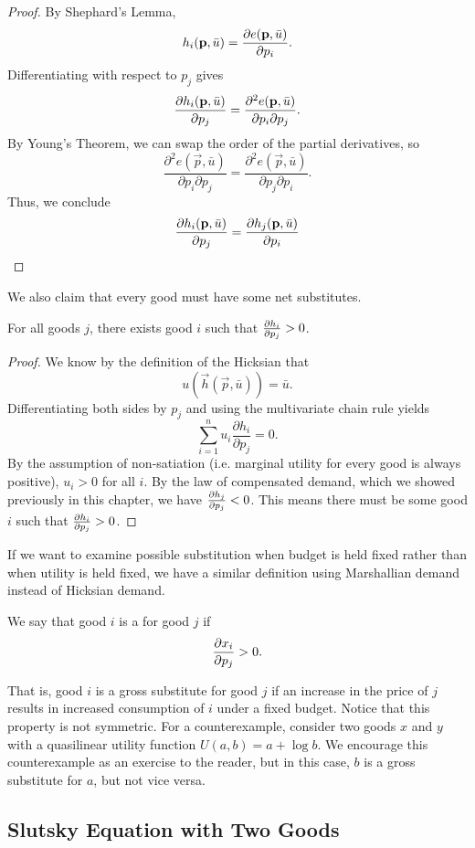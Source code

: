 \begin{proof}
By Shephard's Lemma, 
$$h_i(\mathbf{p}, \bar{u}) = \pdv{e(\mathbf{p}, \bar{u})}{p_i}.$$
Differentiating with respect to $p_j$ gives
$$\pdv{h_i(\mathbf{p}, \bar{u})}{p_j} = \frac{\partial^2 e(\mathbf{p}, \bar{u})}{\partial p_i \partial p_j}.$$
By Young's Theorem, we can swap the order of the partial derivatives, so 
$$\frac{\partial^2 e(\vec{p}, \bar{u})}{\partial p_i \partial p_j} = \frac{\partial^2 e(\vec{p}, \bar{u})}{\partial p_j \partial p_i}.$$
Thus, we conclude 
$$\pdv{h_i(\mathbf{p}, \bar{u})}{p_j} = \pdv{h_j(\mathbf{p}, \bar{u})}{p_i}$$
\end{proof}
We also claim that every good must have some net substitutes.
\begin{proposition*}
For all goods $j$, there exists good $i$ such that $\pdv{h_i}{p_j} > 0$.
\end{proposition*}
\begin{proof}
We know by the definition of the Hicksian that
$$u(\vec{h}(\vec{p}, \bar{u})) = \bar{u}.$$
Differentiating both sides by $p_j$ and using the multivariate chain rule yields 
$$
\sum_{i=1}^{n} u_{i} \frac{\partial h_{i}}{\partial p_{j}}=0.
$$
By the assumption of non-satiation (i.e. marginal utility for every good is always positive), $u_i > 0$ for all $i$. By the law of compensated demand, which we showed previously in this chapter, we have $\pdv{h_j}{p_j} < 0$. This means there must be some good $i$ such that $\pdv{h_i}{p_j} > 0$.
\end{proof}

If we want to examine possible substitution when budget is held fixed rather than when utility is held fixed, we have a similar definition using Marshallian demand instead of Hicksian demand.

\begin{definition*}
We say that good $i$ is a  for good $j$ if
$$\pdv{x_i}{p_j} > 0.$$
\end{definition*}
That is, good $i$ is a gross substitute for good $j$ if an increase in the price of $j$ results in increased consumption of $i$ under a fixed budget. Notice that this property is not symmetric. For a counterexample, consider two goods $x$ and $y$ with a quasilinear utility function $U(a, b) = a + \log b$. We encourage this counterexample as an exercise to the reader, but in this case, $b$ is a gross substitute for $a$, but not vice versa.

\subsection*{Slutsky Equation with Two Goods}

